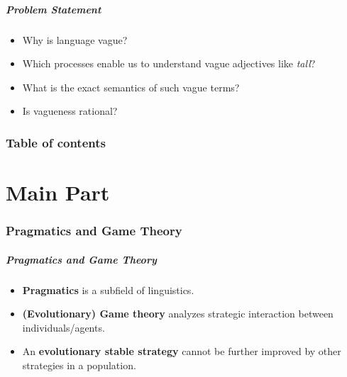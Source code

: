 \documentclass[8pt]{beamer}
\newcommand{\stp}{\item[$\bullet$]}%
\begin{document}
\subsection*{}%
\begin{frame}
\frametitle{Problem Statement}
\vskip5mm
	\begin{itemize}
		 \stp Why is language vague?\newline
		 \stp Which processes enable us to understand vague adjectives like \textit{tall}?\newline
      	 \stp What is the exact semantics of such vague terms?\newline
      	 \stp Is vagueness rational?\newline
     \end{itemize}
\end{frame}

\section{Table of contents}
\part{Main Part}

\section{Pragmatics and Game Theory} 
\subsection*{}%
\begin{frame}
\frametitle{Pragmatics and Game Theory}
\vskip5mm
	\begin{itemize}
        \stp \textbf{Pragmatics} is a subfield of linguistics.\newline
		\stp \textbf{(Evolutionary) Game theory} analyzes strategic interaction between individuals/agents.\newline
		\stp An \textbf{evolutionary stable strategy} cannot be further improved by other strategies in a population.\newline
     \end{itemize}
\end{frame}
\end{document}
